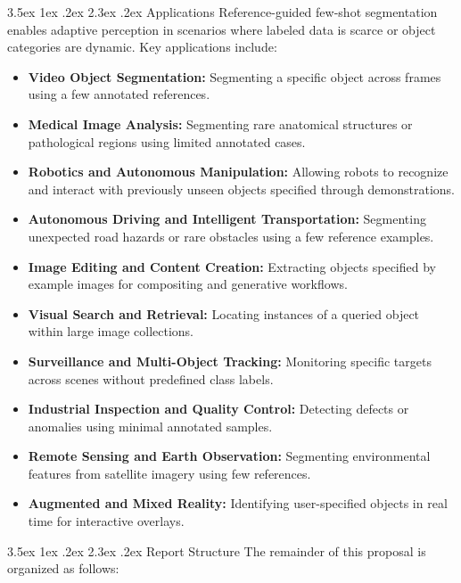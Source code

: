 \documentclass[journal,12pt,onecolumn,draftclsnofoot]{IEEEtran}
\makeatletter
\renewcommand{\section}{\@startsection{section}{1}{\z@}%
    {3.5ex \@plus 1ex \@minus .2ex}%
    {2.3ex \@plus.2ex}%
    {\normalfont\Large\bfseries}}
\makeatother
\begin{document}
\section{Applications}
Reference-guided few-shot segmentation enables adaptive perception in scenarios where labeled data is scarce or object categories are dynamic. Key applications include:
\begin{itemize}
    \item \textbf{Video Object Segmentation:} Segmenting a specific object across frames using a few annotated references.
    \item \textbf{Medical Image Analysis:} Segmenting rare anatomical structures or pathological regions using limited annotated cases.
    \item \textbf{Robotics and Autonomous Manipulation:} Allowing robots to recognize and interact with previously unseen objects specified through demonstrations.
    \item \textbf{Autonomous Driving and Intelligent Transportation:} Segmenting unexpected road hazards or rare obstacles using a few reference examples.
    \item \textbf{Image Editing and Content Creation:} Extracting objects specified by example images for compositing and generative workflows.
    \item \textbf{Visual Search and Retrieval:} Locating instances of a queried object within large image collections.
    \item \textbf{Surveillance and Multi-Object Tracking:} Monitoring specific targets across scenes without predefined class labels.
    \item \textbf{Industrial Inspection and Quality Control:} Detecting defects or anomalies using minimal annotated samples.
    \item \textbf{Remote Sensing and Earth Observation:} Segmenting environmental features from satellite imagery using few references.
    \item \textbf{Augmented and Mixed Reality:} Identifying user-specified objects in real time for interactive overlays.
\end{itemize}

\newpage

\section{Report Structure}
The remainder of this proposal is organized as follows:
\end{document}
